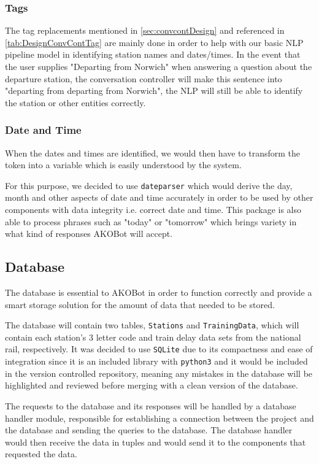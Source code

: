 \documentclass[11pt]{article}
\newcommand{\code}[1]{{\texttt{#1}}}
\begin{document}
        \subsubsection{Tags}
        The tag replacements mentioned in \cref{sec:convcontDesign} and referenced in \cref{tab:DesignConvContTag} are mainly done in order to help with our basic NLP pipeline model in identifying station names and dates/times. In the event that the user supplies "Departing from Norwich" when answering a question about the departure station, the conversation controller will make this sentence into "departing from departing from Norwich", the NLP will still be able to identify the station or other entities correctly.

        \subsubsection{Date and Time}
        When the dates and times are identified, we would then have to transform the token into a variable which is easily understood by the system. 
        
        For this purpose, we decided to use \code{dateparser} which would derive the day, month and other aspects of date and time accurately in order to be used by other components with data integrity i.e. correct date and time. This package is also able to process phrases such as "today" or "tomorrow" which brings variety in what kind of responses AKOBot will accept.


    \subsection{Database}\label{sec:DesignDB}
    The database is essential to AKOBot in order to function correctly and provide a smart storage solution for the amount of data that needed to be stored. 

    The database will contain two tables, \code{Stations} and \code{TrainingData}, which will contain each station's 3 letter code and train delay data sets from the national rail, respectively. It was decided to use \code{SQLite} due to its compactness and ease of integration since it is an included library with \code{python3} and it would be included in the version controlled repository, meaning any mistakes in the database will be highlighted and reviewed before merging with a clean version of the database.
    
    The requests to the database and its responses will be handled by a database handler module, responsible for establishing a connection between the project and the database and sending the queries to the database. The database handler would then receive the data in tuples and would send it to the components that requested the data.
    
\end{document}
